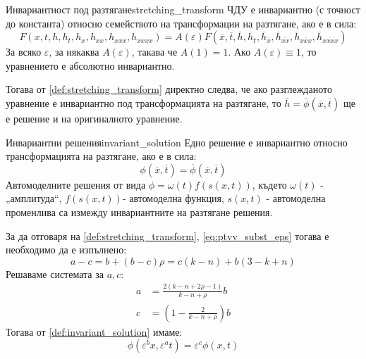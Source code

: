 \begin{definition}{Инвариантност под разтягане}{stretching_transform}
    ЧДУ е инвариантно (с точност до константа) относно семейството на трансформации на разтягане, ако е в сила:
    \begin{equation*}
        \label{eq:stretching_transform}
        F(x,t,h,{h_t},{h_x},{h_{xx}},{h_{xxx}},{h_{xxxx}}) = A(\varepsilon )F(\overline x ,\overline t ,\overline h ,\overline h \overline {_t} ,{\overline h _{\overline x }},{\overline h _{\overline {xx} }},{\overline h _{\overline {xxx} }},{\overline h _{\overline {xxxx} }})
    \end{equation*}
    За всяко  $\varepsilon$, за някаква $A(\varepsilon)$, такава че $A(1) = 1$. Ако $A(\varepsilon) \equiv 1$, то уравнението е абсолютно инвариантно.
\end{definition}
Тогава от \autoref{def:stretching_transform} директно следва, че ако разглежданото уравнение е инвариантно под трансформацията на разтягане, то $\overline{h} = \overline{\phi}(\overline{x}, \overline{t})$ ще е решение и на оригиналното уравнение.
\begin{definition}{Инвариантни решения}{invariant_solution}
    Едно решение е инвариантно относно трансформацията на разтягане, ако е в сила:
    \begin{equation*}
        \label{eq:invariant_equation}
        \phi (\overline x ,\overline t ) = \overline \phi  (\overline x ,\overline t )
    \end{equation*}
    Автомоделните решения от вида $\phi  = \omega (t)f(s(x,t))$, където $\omega(t)$ - „амплитуда“,  $f(s(x,t))$- автомоделна функция,  $s(x,t)$ - автомоделна променлива са измежду инвариантните на разтягане решения.
\end{definition}
\noindent За да отговаря на \autoref{def:stretching_transform}, \autoref{eq:ptvv_subst_eps} тогава е необходимо да е изпълнено:
\begin{equation*}
    a - c = b + (b - c)\rho  = c(k - n) + b(3 - k + n)
\end{equation*}
Решаваме системата за $a, c$:
\begin{align*}
    a &= \frac{{2\left( {k - n + 2\rho  - 1} \right)}}{{k - n + \rho }}b \\
    c &= \left( {1 - \frac{2}{{k - n + \rho }}} \right)b
\end{align*}
Тогава от \autoref{def:invariant_solution} имаме:
\begin{equation*}
    \phi ({\varepsilon ^b}x,{\varepsilon ^a}t) = {\varepsilon ^c}\phi (x,t)
\end{equation*}
